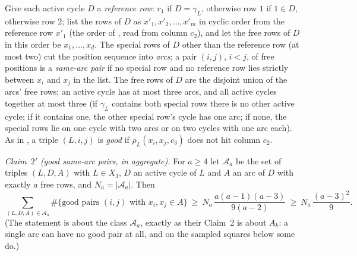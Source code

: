 Give each active cycle $D$ a \emph{reference row}: $r_1$ if $D=\gamma_L$,
otherwise row $1$ if $1\in D$, otherwise row $2$; list the rows of $D$
as $x'_1,x'_2,\dots,x'_m$ in cyclic order from the reference row
$x'_1$ (the order of \cite[p.~16]{AM26}, read from column $c_2$), and
let the free rows of $D$ in this order be $x_1,\dots,x_d$.  The
special rows of $D$ other than the reference row (at most two) cut the
position sequence into \emph{arcs}; a pair $(i,j)$, $i<j$, of free
positions is a \emph{same-arc pair} if no special row and no
reference row lies strictly between $x_i$ and $x_j$ in the list.  The
free rows of $D$ are the disjoint union of the arcs' free rows; an
active cycle has at most three arcs, and all active cycles together at
most three (if $\gamma_L$ contains both special rows there is no other
active cycle; if it contains one, the other special row's cycle has
one arc; if none, the special rows lie on one cycle with two arcs or
on two cycles with one arc each).  As in \cite{AM26}, a triple
$(L,i,j)$ is \emph{good} if $\rho_L(x_i,x_j,c_3)$ does not hit column
$c_2$.

\emph{Claim~$2'$ (good same-arc pairs, in aggregate).}  For $a\ge4$ let
$\mathcal A_a$ be the set of triples $(L,D,A)$ with $L\in X_3$, $D$ an
active cycle of $L$ and $A$ an arc of $D$ with exactly $a$ free rows,
and $N_a=|\mathcal A_a|$.  Then
\[
\sum_{(L,D,A)\in\mathcal A_a}\#\{\text{good pairs }(i,j)\text{ with }x_i,x_j\in A\}
\ \ge\ N_a\,\frac{a(a-1)(a-3)}{9(a-2)}\ \ge\ N_a\,\frac{(a-3)^2}{9}.
\]
(The statement is about the class $\mathcal A_a$, exactly as their
Claim~2 is about $A_k$: a single arc can have no good pair at all, and
on the sampled squares below some do.)

